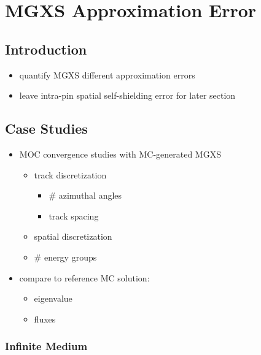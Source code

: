 \chapter{MGXS Approximation Error}
\label{chap:mgxs-approx-error}

\section{Introduction}
\label{sec:chap4-intro}

\begin{itemize}
  \item quantify \ac{MGXS} different approximation errors
  \item leave intra-pin spatial self-shielding error for later section
\end{itemize}


\section{Case Studies}
\label{sec:chap4-case-studies}

\begin{itemize}
  \item \ac{MOC} convergence studies with \ac{MC}-generated \ac{MGXS}
  \begin{itemize}
    \item track discretization
    \begin{itemize}
      \item \# azimuthal angles
      \item track spacing
    \end{itemize}
    \item spatial discretization
    \item \# energy groups  
  \end{itemize}
  \item compare to reference \ac{MC} solution:
  \begin{itemize}
    \item eigenvalue
    \item fluxes
  \end{itemize}
\end{itemize}

\subsection{Infinite Medium}
\label{subsec:chap4-inf-medium}

